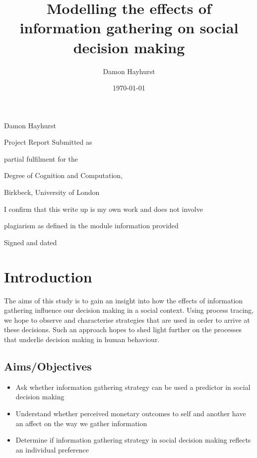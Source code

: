\documentclass[man, floatsintext]{apa7}
\title{Modelling the effects of information gathering on social decision making}
\author{Damon Hayhurst}
\date{\today}
\makeatletter
\renewcommand{\maketitle}{
	\begin{titlepage}
		\centering
		\vspace*{0.4in}
		{\Huge \bfseries \@title \par}
		\vspace{0.2in}
		{\LARGE Damon Hayhurst \par}
		\vspace{0.3in}
		{\Large Project Report Submitted as\par}
		{\Large partial fulfilment for the\par}
		{\Large Degree of Cognition and Computation,\par}
		\vfill
		{\Large Birkbeck, University of London\par}
		{\Large \@date \par}
		\vfill
		{\Large
			\begin{center}
				I confirm that this write up is my own work and does not involve\par
				plagiarism as defined in the module information provided
			\end{center}
		}
		{\Large Signed and dated\par}
		\vspace{1in}
	\end{titlepage}
}
\makeatother
\begin{document}
\maketitle


\abstract


\section{Introduction}





The aims of this study is to gain an insight into how the effects of information gathering influence our decision making in a social context.  Using process tracing, we hope to observe and characterise strategies that are used in order to arrive at these decisions. Such an approach hopes to shed light further on the processes that underlie decision making in human behaviour.


\subsection{Aims/Objectives}

\begin{itemize}
	\item Ask whether information gathering strategy can be used a predictor in social decision making
	\item Understand whether perceived monetary outcomes to self and another have an affect on the way we gather information
	\item Determine if information gathering strategy in social decision making reflects an individual preference
\end{itemize}
\end{document}

